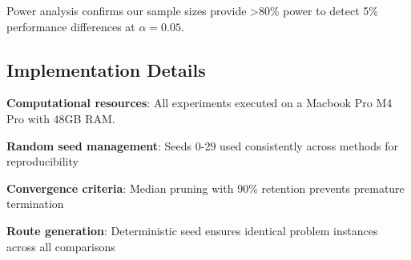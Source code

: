Power analysis confirms our sample sizes provide >80\% power to detect 5\% performance differences at $\alpha = 0.05$.

\subsection{Implementation Details}
\label{sec:appendix_implementation}

\textbf{Computational resources}: All experiments executed on a Macbook Pro M4 Pro with 48GB RAM.

\textbf{Random seed management}: Seeds 0-29 used consistently across methods for reproducibility

\textbf{Convergence criteria}: Median pruning with 90\% retention prevents premature termination

\textbf{Route generation}: Deterministic seed ensures identical problem instances across all comparisons 